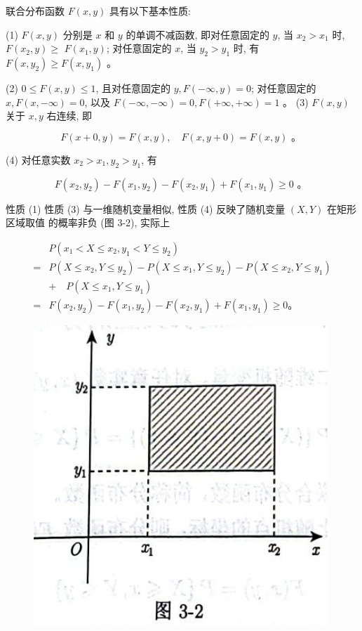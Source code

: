 \documentclass{beamer}
\begin{document}
	\begin{frame}
		联合分布函数 $F(x, y)$ 具有以下基本性质:
		
		(1) $F(x, y)$ 分别是 $x$ 和 $y$ 的单调不减函数, 即对任意固定的 $y$, 当 $x_{2}>x_{1}$ 时, $F\left(x_{2}, y\right) \geqslant$ $F\left(x_{1}, y\right)$; 对任意固定的 $x$, 当 $y_{2}>y_{1}$ 时, 有 $F\left(x, y_{2}\right) \geqslant F\left(x, y_{1}\right)$ 。
		
		(2) $0 \leqslant F(x, y) \leqslant 1$, 且对任意固定的 $y, F(-\infty, y)=0$; 对任意固定的 $x, F(x,-\infty)=0$, 以及 $F(-\infty,-\infty)=0, F(+\infty,+\infty)=1$ 。 (3) $F(x, y)$ 关于 $x, y$ 右连续, 即
		
		$$
		F(x+0, y)=F(x, y), \quad F(x, y+0)=F(x, y) \text { 。 }
		$$
		
		(4) 对任意实数 $x_{2}>x_{1}, y_{2}>y_{1}$, 有
		
		$$
		F\left(x_{2}, y_{2}\right)-F\left(x_{1}, y_{2}\right)-F\left(x_{2}, y_{1}\right)+F\left(x_{1}, y_{1}\right) \geqslant 0 \text { 。 }
		$$
		
		性质 (1) 性质 (3) 与一维随机变量相似, 性质 (4) 反映了随机变量 $(X, Y)$ 在矩形区域取值 的概率非负 (图 3-2), 实际上
	\end{frame}
	
	\begin{frame}
	$$
	\begin{aligned}
		& P\left(x_{1}<X \leqslant x_{2}, y_{1}<Y \leqslant y_{2}\right) \\
		= & P\left(X \leqslant x_{2}, Y \leqslant y_{2}\right)-P\left(X \leqslant x_{1}, Y \leqslant y_{2}\right)-P\left(X \leqslant x_{2}, Y \leqslant y_{1}\right) \\ 
		& + \quad P\left(X \leqslant x_{1}, Y \leqslant y_{1}\right) \\
		= & F\left(x_{2}, y_{2}\right)-F\left(x_{1}, y_{2}\right)-F\left(x_{2}, y_{1}\right)+F\left(x_{1}, y_{1}\right) \geqslant 0 。
	\end{aligned}
	$$
	\begin{figure}
		\centering
		\includegraphics[scale=0.3]{figures/figure3-2.png}
	\end{figure}
	\end{frame}
	
\end{document}
